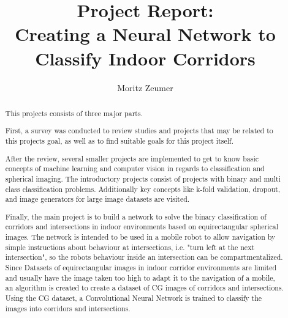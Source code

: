 \documentclass[sigconf, nonacm]{acmart}
\begin{document}
\title[Project Report]{Project Report:\\ Creating a Neural Network to Classify Indoor Corridors}

\author{Moritz Zeumer}

\renewcommand{\shortauthors}{Zeumer}

\begin{abstract}
This projects consists of three major parts.

First, a survey was conducted to review studies and projects that may be related to this projects goal, as well as to find suitable goals for this project itself.

After the review, several smaller projects are implemented to get to know basic concepts of machine learning and computer vision in regards to classification and spherical imaging.
The introductory projects consist of projects with binary and multi class classification problems.
Additionally key concepts like k-fold validation, dropout, and image generators for large image datasets are visited.

Finally, the main project is to build a network to solve the binary classification of corridors and intersections in indoor environments based on equirectangular spherical images.
The network is intended to be used in a mobile robot to allow navigation by simple instructions about behaviour at intersections, i.e. "turn left at the next intersection", so the robots behaviour inside an intersection can be compartmentalized.
Since Datasets of equirectangular images in indoor corridor environments are limited and usually have the image taken too high to adapt it to the navigation of a mobile, an algorithm is created to create a dataset of CG images of corridors and intersections.
Using the CG dataset, a Convolutional Neural Network is trained to classify the images into corridors and intersections.
\end{abstract}

\keywords{}
\end{document}
